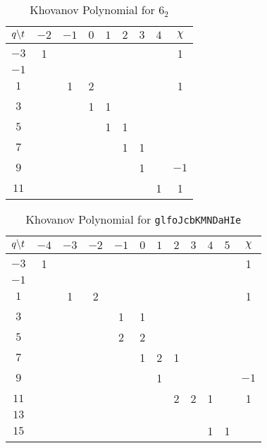 \begin{table}
    \centering
    \begin{tabular}{| c | c | c | c | c | c | c | c | c |}
        \hline
        $q\symbol{92}t$&$-2$&$-1$&$0$&$1$&$2$&$3$&$4$&$\chi$\\
        \hline
        $-3$&1&&&&&&&1\\
        \hline
        $-1$&&&&&&&&\\
        \hline
        $1$&&1&2&&&&&1\\
        \hline
        $3$&&&1&1&&&&\\
        \hline
        $5$&&&&1&1&&&\\
        \hline
        $7$&&&&&1&1&&\\
        \hline
        $9$&&&&&&1&&$-1$\\
        \hline
        $11$&&&&&&&1&1\\
        \hline
    \end{tabular}
    \caption{Khovanov Polynomial for $6_{2}$}
\end{table}
\begin{table}
    \centering
    \begin{tabular}{| c | c | c | c | c | c | c | c | c | c | c | c |}
        \hline
        $q\symbol{92}t$&$-4$&$-3$&$-2$&$-1$&$0$&$1$&$2$&$3$&$4$&$5$&$\chi$\\
        \hline
        $-3$&1&&&&&&&&&&1\\
        \hline
        $-1$&&&&&&&&&&&\\
        \hline
        $1$&&1&2&&&&&&&&1\\
        \hline
        $3$&&&&1&1&&&&&&\\
        \hline
        $5$&&&&2&2&&&&&&\\
        \hline
        $7$&&&&&1&2&1&&&&\\
        \hline
        $9$&&&&&&1&&&&&$-1$\\
        \hline
        $11$&&&&&&&2&2&1&&1\\
        \hline
        $13$&&&&&&&&&&&\\
        \hline
        $15$&&&&&&&&&1&1&\\
        \hline
    \end{tabular}
    \caption{Khovanov Polynomial for \texttt{glfoJcbKMNDaHIe}}
\end{table}

